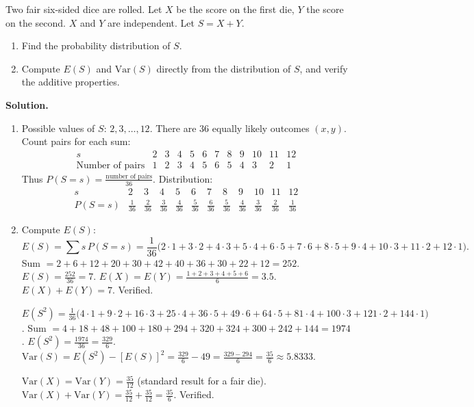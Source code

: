 \documentclass[11pt]{article}
\begin{document}
\begin{exoresolu}
Two fair six-sided dice are rolled. Let $X$ be the score on the first die, $Y$ the score on the second. $X$ and $Y$ are independent. Let $S=X+Y$.
\begin{enumerate}
\item Find the probability distribution of $S$.
\item Compute $E(S)$ and $\text{Var}(S)$ directly from the distribution of $S$, and verify the additive properties.
\end{enumerate}
\tcblower
\textbf{Solution.}
\begin{enumerate}
\item Possible values of $S$: $2,3,\dots,12$. There are $36$ equally likely outcomes $(x,y)$. Count pairs for each sum:
\[
\begin{array}{c|ccccccccccc}
s & 2 & 3 & 4 & 5 & 6 & 7 & 8 & 9 & 10 & 11 & 12 \\ \hline
\text{Number of pairs} & 1 & 2 & 3 & 4 & 5 & 6 & 5 & 4 & 3 & 2 & 1
\end{array}
\]
Thus $P(S=s)=\frac{\text{number of pairs}}{36}$.
Distribution:
\[
\begin{array}{c|ccccccccccc}
s & 2 & 3 & 4 & 5 & 6 & 7 & 8 & 9 & 10 & 11 & 12 \\ \hline
P(S=s) & \frac1{36} & \frac2{36} & \frac3{36} & \frac4{36} & \frac5{36} & \frac6{36} & \frac5{36} & \frac4{36} & \frac3{36} & \frac2{36} & \frac1{36}
\end{array}
\]

\item Compute $E(S)$:
\[
E(S)=\sum s\,P(S=s)=\frac{1}{36}\bigl(2\cdot1+3\cdot2+4\cdot3+5\cdot4+6\cdot5+7\cdot6+8\cdot5+9\cdot4+10\cdot3+11\cdot2+12\cdot1\bigr).
\]
Sum $=2+6+12+20+30+42+40+36+30+22+12=252$. $E(S)=\frac{252}{36}=7$.
$E(X)=E(Y)=\frac{1+2+3+4+5+6}{6}=3.5$. $E(X)+E(Y)=7$. Verified.

$E(S^2)=\frac{1}{36}\bigl(4\cdot1+9\cdot2+16\cdot3+25\cdot4+36\cdot5+49\cdot6+64\cdot5+81\cdot4+100\cdot3+121\cdot2+144\cdot1\bigr)$.
Sum $=4+18+48+100+180+294+320+324+300+242+144=1974$. $E(S^2)=\frac{1974}{36}=\frac{329}{6}$.
$\text{Var}(S)=E(S^2)-[E(S)]^2=\frac{329}{6}-49=\frac{329-294}{6}=\frac{35}{6}\approx5.8333$.

$\text{Var}(X)=\text{Var}(Y)=\frac{35}{12}$ (standard result for a fair die). $\text{Var}(X)+\text{Var}(Y)=\frac{35}{12}+\frac{35}{12}=\frac{35}{6}$. Verified.
\end{enumerate}
\end{exoresolu}
\end{document}
